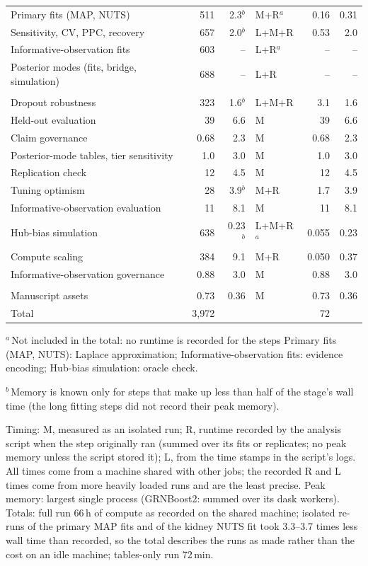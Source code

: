 \documentclass[11pt,a4paper]{article}
\begin{document}
\begin{table}[tbp]
\begin{tabular}{@{}lrrlrr@{}}
Primary fits (MAP, NUTS) & 511 & 2.3$^{b}$ & M+R$^{a}$ & 0.16 & 0.31 \\
Sensitivity, CV, PPC, recovery & 657 & 2.0$^{b}$ & L+M+R & 0.53 & 2.0 \\
Informative-observation fits & 603 & -- & L+R$^{a}$ & -- & -- \\
Posterior modes (fits, bridge, simulation) & 688 & -- & L+R & -- & -- \\
\addlinespace[3pt]
\multicolumn{6}{@{}l}{\emph{Evaluation}} \\
Dropout robustness & 323 & 1.6$^{b}$ & L+M+R & 3.1 & 1.6 \\
Held-out evaluation & 39 & 6.6 & M & 39 & 6.6 \\
Claim governance & 0.68 & 2.3 & M & 0.68 & 2.3 \\
Posterior-mode tables, tier sensitivity & 1.0 & 3.0 & M & 1.0 & 3.0 \\
Replication check & 12 & 4.5 & M & 12 & 4.5 \\
Tuning optimism & 28 & 3.9$^{b}$ & M+R & 1.7 & 3.9 \\
Informative-observation evaluation & 11 & 8.1 & M & 11 & 8.1 \\
Hub-bias simulation & 638 & 0.23$^{b}$ & L+M+R$^{a}$ & 0.055 & 0.23 \\
Compute scaling & 384 & 9.1 & M+R & 0.050 & 0.37 \\
Informative-observation governance & 0.88 & 3.0 & M & 0.88 & 3.0 \\
\addlinespace[3pt]
\multicolumn{6}{@{}l}{\emph{Assets}} \\
Manuscript assets & 0.73 & 0.36 & M & 0.73 & 0.36 \\
\midrule
Total & 3{,}972 &  &  & 72 &  \\
\bottomrule
\end{tabular}
\par\smallskip
\begin{minipage}{\linewidth}\footnotesize
$^{a}$\,Not included in the total: no runtime is recorded for the steps Primary fits (MAP, NUTS): Laplace approximation; Informative-observation fits: evidence encoding; Hub-bias simulation: oracle check.

$^{b}$\,Memory is known only for steps that make up less than half of the stage's wall time (the long fitting steps did not record their peak memory).

Timing: M, measured as an isolated run; R, runtime recorded by the analysis script when the step originally ran (summed over its fits or replicates; no peak memory unless the script stored it); L, from the time stamps in the script's logs. All times come from a machine shared with other jobs; the recorded R and L times come from more heavily loaded runs and are the least precise. Peak memory: largest single process (GRNBoost2: summed over its dask workers). Totals: full run 66\,h of compute as recorded on the shared machine; isolated re-runs of the primary MAP fits and of the kidney NUTS fit took 3.3--3.7 times less wall time than recorded, so the total describes the runs as made rather than the cost on an idle machine; tables-only run 72\,min.
\end{minipage}
\end{table}
\end{document}
